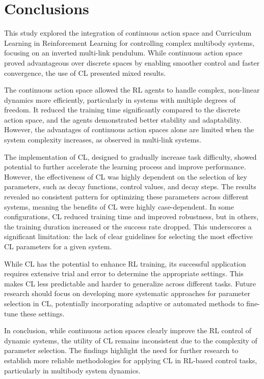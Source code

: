 \section{Conclusions}
This study explored the integration of continuous action space and Curriculum Learning in Reinforcement Learning for controlling complex multibody systems, focusing on an inverted multi-link pendulum. While continuous action space proved advantageous over discrete spaces by enabling smoother control and faster convergence, the use of CL presented mixed results.

The continuous action space allowed the RL agents to handle complex, non-linear dynamics more efficiently, particularly in systems with multiple degrees of freedom. It reduced the training time significantly compared to the discrete action space, and the agents demonstrated better stability and adaptability. However, the advantages of continuous action spaces alone are limited when the system complexity increases, as observed in multi-link systems.

The implementation of CL, designed to gradually increase task difficulty, showed potential to further accelerate the learning process and improve performance. However, the effectiveness of CL was highly dependent on the selection of key parameters, such as decay functions, control values, and decay steps. The results revealed no consistent pattern for optimizing these parameters across different systems, meaning the benefits of CL were highly case-dependent. In some configurations, CL reduced training time and improved robustness, but in others, the training duration increased or the success rate dropped. This underscores a significant limitation: the lack of clear guidelines for selecting the most effective CL parameters for a given system.

While CL has the potential to enhance RL training, its successful application requires extensive trial and error to determine the appropriate settings. This makes CL less predictable and harder to generalize across different tasks. Future research should focus on developing more systematic approaches for parameter selection in CL, potentially incorporating adaptive or automated methods to fine-tune these settings.

In conclusion, while continuous action spaces clearly improve the RL control of dynamic systems, the utility of CL remains inconsistent due to the complexity of parameter selection. The findings highlight the need for further research to establish more reliable methodologies for applying CL in RL-based control tasks, particularly in multibody system dynamics.

